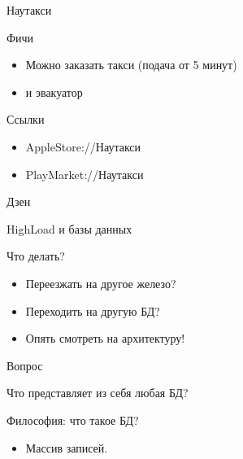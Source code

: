 \documentclass[aspectratio=169]{beamer}
\begin{document}
\begin{frame}{Наутакси}
    \begin{block}{Фичи}
        \begin{itemize}
            \item Можно заказать такси (подача от 5 минут)
            \item и эвакуатор
        \end{itemize}
    \end{block}

    \begin{block}{Ссылки}
        \begin{itemize}
            \item AppleStore://Наутакси
            \item PlayMarket://Наутакси
        \end{itemize}
    \end{block}

\end{frame}

\begin{frame}
    \begin{center}
        {\huge Дзен}
    \end{center}
\end{frame}


\begin{frame}{HighLoad и базы данных}
    \begin{block}{Что делать?}
        \begin{itemize}
            \item Переезжать на другое железо?
            \item Переходить на другую БД?
        \end{itemize}
        \par
        \begin{itemize}
            \pause\item Опять смотреть на архитектуру!
        \end{itemize}
    \end{block}
\end{frame}


\begin{frame}{Вопрос}
    \begin{center}
        {\huge Что представляет из себя любая БД?}
    \end{center}
\end{frame}

\begin{frame}{Философия: что такое БД?}
    \begin{itemize}
        \pause\item Массив записей.
    \end{itemize}
\end{frame}
\end{document}
